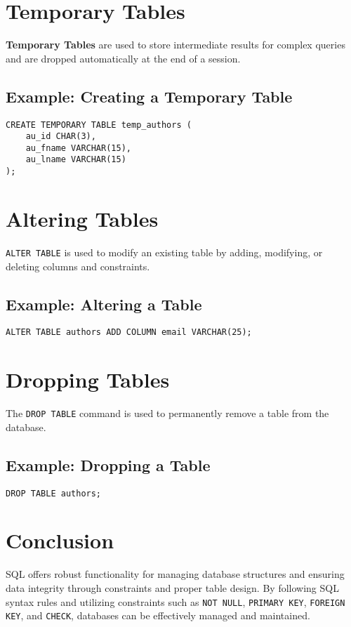 \documentclass{article}
\begin{document}
\section{Temporary Tables}
\textbf{Temporary Tables} are used to store intermediate results for complex queries and are dropped automatically at the end of a session.

\subsection{Example: Creating a Temporary Table}
\begin{verbatim}
CREATE TEMPORARY TABLE temp_authors (
    au_id CHAR(3),
    au_fname VARCHAR(15),
    au_lname VARCHAR(15)
);
\end{verbatim}

\section{Altering Tables}
\texttt{ALTER TABLE} is used to modify an existing table by adding, modifying, or deleting columns and constraints.

\subsection{Example: Altering a Table}
\begin{verbatim}
ALTER TABLE authors ADD COLUMN email VARCHAR(25);
\end{verbatim}

\section{Dropping Tables}
The \texttt{DROP TABLE} command is used to permanently remove a table from the database.

\subsection{Example: Dropping a Table}
\begin{verbatim}
DROP TABLE authors;
\end{verbatim}

\section{Conclusion}
SQL offers robust functionality for managing database structures and ensuring data integrity through constraints and proper table design. By following SQL syntax rules and utilizing constraints such as \texttt{NOT NULL}, \texttt{PRIMARY KEY}, \texttt{FOREIGN KEY}, and \texttt{CHECK}, databases can be effectively managed and maintained.
\end{document}
